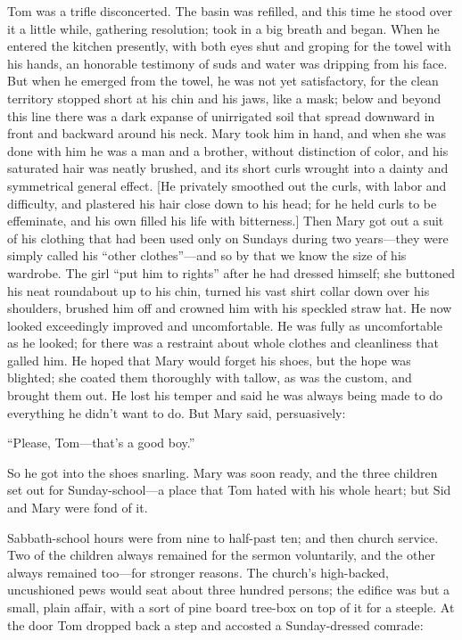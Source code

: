 \documentclass{book}
\begin{document}
Tom was a trifle disconcerted. The basin was refilled, and this time he stood over it a little while, gathering resolution; took in a big breath and began. When he entered the kitchen presently, with both eyes shut and groping for the towel with his hands, an honorable testimony of suds and water was dripping from his face. But when he emerged from the towel, he was not yet satisfactory, for the clean territory stopped short at his chin and his jaws, like a mask; below and beyond this line there was a dark expanse of unirrigated soil that spread downward in front and backward around his neck. Mary took him in hand, and when she was done with him he was a man and a brother, without distinction of color, and his saturated hair was neatly brushed, and its short curls wrought into a dainty and symmetrical general effect. [He privately smoothed out the curls, with labor and difficulty, and plastered his hair close down to his head; for he held curls to be effeminate, and his own filled his life with bitterness.] Then Mary got out a suit of his clothing that had been used only on Sundays during two years—they were simply called his “other clothes”—and so by that we know the size of his wardrobe. The girl “put him to rights” after he had dressed himself; she buttoned his neat roundabout up to his chin, turned his vast shirt collar down over his shoulders, brushed him off and crowned him with his speckled straw hat. He now looked exceedingly improved and uncomfortable. He was fully as uncomfortable as he looked; for there was a restraint about whole clothes and cleanliness that galled him. He hoped that Mary would forget his shoes, but the hope was blighted; she coated them thoroughly with tallow, as was the custom, and brought them out. He lost his temper and said he was always being made to do everything he didn’t want to do. But Mary said, persuasively:

“Please, Tom—that’s a good boy.”

So he got into the shoes snarling. Mary was soon ready, and the three children set out for Sunday-school—a place that Tom hated with his whole heart; but Sid and Mary were fond of it.

Sabbath-school hours were from nine to half-past ten; and then church service. Two of the children always remained for the sermon voluntarily, and the other always remained too—for stronger reasons. The church’s high-backed, uncushioned pews would seat about three hundred persons; the edifice was but a small, plain affair, with a sort of pine board tree-box on top of it for a steeple. At the door Tom dropped back a step and accosted a Sunday-dressed comrade:
\end{document}
